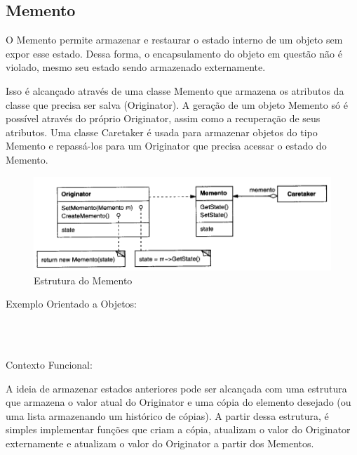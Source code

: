 \subsection{Memento}

O Memento permite armazenar e restaurar o estado interno de um 
objeto sem expor esse estado. Dessa forma, o encapsulamento do 
objeto em questão não é violado, mesmo seu estado sendo armazenado 
externamente.

Isso é alcançado através de uma classe Memento que armazena os 
atributos da classe que precisa ser salva (Originator). A geração 
de um objeto Memento só é possível através do próprio Originator, 
assim como a recuperação de seus atributos. Uma classe Caretaker 
é usada para armazenar objetos do tipo Memento e repassá-los para 
um Originator que precisa acessar o estado do Memento.

\begin{figure}[htb]
	\caption{\label{fig_grafico}Estrutura do Memento}
	\begin{center}
	    \includegraphics[scale=0.5]{5_padroes-contexto-funcional/5.3_comportamentais/5.3.06_memento/diagram.png}
	\end{center}
\end{figure}

Exemplo Orientado a Objetos:

\begin{lstlisting}[caption={Memento Orientação a Objetos},label=oomemento]



\end{lstlisting}

Contexto Funcional:

A ideia de armazenar estados anteriores pode ser alcançada com uma 
estrutura que armazena o valor atual do Originator e uma cópia do 
elemento desejado (ou uma lista armazenando um histórico de cópias). 
A partir dessa estrutura, é simples implementar funções que criam 
a cópia, atualizam o valor do Originator externamente e atualizam 
o valor do Originator a partir dos Mementos.

\begin{lstlisting}[caption={Memento Funcional},label=fpmemento]



\end{lstlisting}